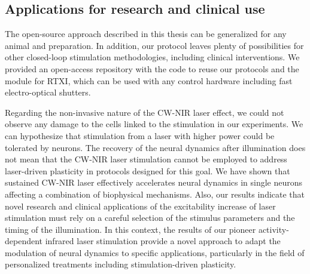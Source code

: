 \subsection{Applications for research and clinical use}
The open-source approach described in this thesis can be generalized for any animal and preparation. In addition, our protocol leaves plenty of possibilities for other closed-loop stimulation methodologies, including clinical interventions. We provided an open-access repository with the code to reuse our protocols and the module for RTXI, which can be used with any control hardware including fast electro-optical shutters. 


Regarding the non-invasive nature of the CW-NIR laser effect, we could not observe any damage to the cells linked to the stimulation in our experiments. We can hypothesize that stimulation from a laser with higher power could be tolerated by neurons. The recovery of the neural dynamics after illumination does not mean that the CW-NIR laser stimulation cannot be employed to address laser-driven plasticity in protocols designed for this goal. We have shown that sustained CW-NIR laser effectively accelerates neural dynamics in single neurons affecting a combination of biophysical mechanisms. Also, our results indicate that novel research and clinical applications of the excitability increase of laser stimulation must rely on a careful selection of the stimulus parameters and the timing of the illumination. In this context, the results of our pioneer activity-dependent infrared laser stimulation provide a novel approach to adapt the modulation of neural dynamics to specific applications, particularly in the field of personalized treatments including stimulation-driven plasticity.

